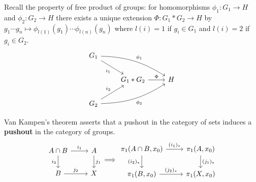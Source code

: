 \documentclass[11pt]{article}
\theoremstyle{definition}
\theoremstyle{plain}
\theoremstyle{remark}
\begin{document}
Recall the property of free product of groups: for homomorphisms $\phi_1:G_1\to H$ and $\phi_2:G_2\to H$ there exists a unique extension $\Phi:G_1\ast G_2\to H$ by $g_1\cdots g_n\mapsto\phi_{l(1)}(g_1)\cdots\phi_{l(n)}(g_n)$ where $l(i)=1$ if $g_i\in G_1$ and $l(i)=2$ if $g_i\in G_2$.
\[\begin{tikzcd}
G_1\arrow[bend left=15]{drr}{\phi_1}\arrow[swap]{dr}{i_1}\\
&G_1\ast G_2\arrow{r}{\Phi}&H\\
G_2\arrow{ur}{i_2}\arrow[swap,bend right=15]{urr}{\phi_2}
\end{tikzcd}\]\medbreak

Van Kampen's theorem asserts that a pushout in the category of sets induces a \textbf{pushout} in the category of groups.
\[\begin{tikzcd}
A\cap B\arrow{r}{i_1}\arrow[swap]{d}{i_2}&A\arrow{d}{j_1}\\
B\arrow{r}{j_2}&X
\end{tikzcd}\Longrightarrow
\begin{tikzcd}
\pi_1(A\cap B,x_0)\arrow{r}{(i_1)_\ast}\arrow[swap]{d}{(i_2)_\ast}&\pi_1(A,x_0)\arrow{d}{(j_1)_\ast}\\
\pi_1(B,x_0)\arrow{r}{(j_2)_\ast}&\pi_1(X,x_0)
\end{tikzcd}\]
\end{document}
